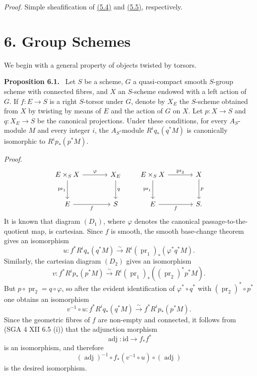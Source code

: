 \documentclass[11pt]{article}
\newenvironment{statement}[1]{\par\medskip\noindent\textbf{#1.}\ }{\par\medskip}
\providecommand{\pr}{\operatorname{pr}}
\providecommand{\pr}{\operatorname{pr}}
\begin{document}
\emph{Proof.} Simple sheafification of \hyperref[sga5:VII:proposition:5.4]{(5.4)} and \hyperref[sga5:VII:proposition:5.5]{(5.5)}, respectively.

\section*{6. Group Schemes}\label{sga5:VII:section:6}

We begin with a general property of objects twisted by torsors.

\label{sga5:VII:proposition:6.1}\begin{statement}{Proposition 6.1}
Let $S$ be a scheme, $G$ a quasi-compact smooth $S$-group scheme with connected fibres, and $X$ an $S$-scheme endowed with a left action of $G$. If $f:E\to S$ is a right $S$-torsor under $G$, denote by $X_E$ the $S$-scheme obtained from $X$ by twisting by means of $E$ and the action of $G$ on $X$. Let $p:X\to S$ and $q:X_E\to S$ be the canonical projections. Under these conditions, for every $A_S$-module $M$ and every integer $i$, the $A_S$-module $R^iq_*(q^*M)$ is canonically isomorphic to $R^ip_*(p^*M)$.
\end{statement}

\emph{Proof.}
\[
\begin{tikzcd}[column sep=large,row sep=large]
E\times_S X \arrow[r,"\varphi"] \arrow[d,"\pr_1"'] & X_E \arrow[d,"q"]\\
E \arrow[r,"f"'] & S
\end{tikzcd}
\qquad
\begin{tikzcd}[column sep=large,row sep=large]
E\times_S X \arrow[r,"\pr_2"] \arrow[d,"\pr_1"'] & X \arrow[d,"p"]\\
E \arrow[r,"f"'] & S .
\end{tikzcd}
\]
It is known that diagram $(D_1)$, where $\varphi$ denotes the canonical passage-to-the-quotient map, is cartesian. Since $f$ is smooth, the smooth base-change theorem gives an isomorphism
\[
u:f^*R^iq_*(q^*M)\xrightarrow{\sim}R^i(\pr_1)_*(\varphi^*q^*M).
\]
Similarly, the cartesian diagram $(D_2)$ gives an isomorphism
\[
v:f^*R^ip_*(p^*M)\xrightarrow{\sim}R^i(\pr_1)_*((\pr_2)^*p^*M).
\]
But $p\circ\pr_2=q\circ\varphi$, so after the evident identification of $\varphi^*\circ q^*$ with $(\pr_2)^*\circ p^*$ one obtains an isomorphism
\[
v^{-1}\circ u:f^*R^iq_*(q^*M)\xrightarrow{\sim} f^*R^ip_*(p^*M).
\]
Since the geometric fibres of $f$ are non-empty and connected, it follows from (SGA 4 XII 6.5 (i)) that the adjunction morphism
\[
\operatorname{adj}:\mathrm{id}\to f_*f^*
\]
is an isomorphism, and therefore
\[
(\operatorname{adj})^{-1}\circ f_*(v^{-1}\circ u)\circ(\operatorname{adj})
\]
is the desired isomorphism.
\end{document}
